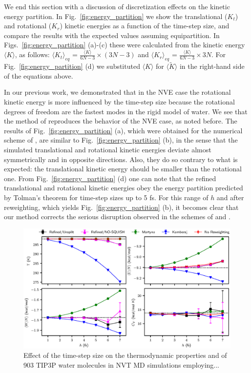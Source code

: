 \documentclass[
journal=jctcce,
layout=twocolumn
]{achemso}
\newcommand{\timestep}{h}
\newcommand{\refined}[1]{\widetilde{#1}}
\begin{document}
We end this section with a discussion of discretization effects on the kinetic energy partition.
In Fig.~\ref{fig:energy_partition} we show the translational ($K_t$) and rotational ($K_r$) kinetic energies as a function of the time-step size, and compare the results with the expected values assuming equipartition.
In Figs.~\ref{fig:energy_partition} (a)-(c) these were calculated from the kinetic energy $\langle K \rangle$, as follows: $\langle K_t \rangle_{eq}$ = $\frac{\langle K \rangle}{6N-3} \times (3N-3)$ and $\langle K_r \rangle_{eq}$ = $\frac{\langle K \rangle}{6N-3} \times 3N$.
For Fig.~\ref{fig:energy_partition} (d) we substituted $\langle K \rangle$ for $\langle \refined{K} \rangle$ in the right-hand side of the equations above.

In our previous work\cite{Silveira_2017}, we demonstrated that in the NVE case the rotational kinetic energy is more influenced by the time-step size because the rotational degrees of freedom are the fastest modes in the rigid model of water. 
We see that the method of \citeauthor{Kamberaj_2005} \cite{Kamberaj_2005} reproduces the behavior of the NVE case, as noted before.
The results of Fig.~\ref{fig:energy_partition} (a), which were obtained for the numerical scheme of \citeauthor{Martyna_1996} \cite{Martyna_1996}, are similar to Fig.~\ref{fig:energy_partition} (b), in the sense that the simulated translational and rotational kinetic energies deviate almost symmetrically and in opposite directions.
Also, they do so contrary to what is expected: the translational kinetic energy should be smaller than the rotational one.
From Fig.~\ref{fig:energy_partition} (d) one can note that the refined translational and rotational kinetic energies obey the energy partition predicted by Tolman's theorem \cite{Tolman_1918} for time-step sizes up to 5 fs.
For this range of $\timestep$ and after reweighting, which yields Fig.~\ref{fig:energy_partition} (b), it becomes clear that our method corrects the serious disruption observed in the schemes of \citeauthor{Martyna_1996} \cite{Martyna_1996} and  \citeauthor{Kamberaj_2005} \cite{Kamberaj_2005}.

\begin{figure}
	\includegraphics{Figures/thermodynamic_properties.eps}
	\caption{Effect of the time-step size on the thermodynamic properties and of 903 TIP3P\cite{Jorgensen_1983} water molecules in NVT MD simulations employing...}
	\label{fig:properties}
\end{figure}
\end{document}
